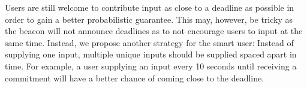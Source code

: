 Users are still welcome to contribute input as close to a deadline as possible in order to gain a better probabilistic guarantee.
This may, however, be tricky as the beacon will not announce deadlines as to not encourage users to input at the same time.
Instead, we propose another strategy for the smart user: Instead of supplying one input, multiple unique inputs should be supplied spaced apart in time.
For example, a user supplying an input every 10 seconds until receiving a commitment will have a better chance of coming close to the deadline.

